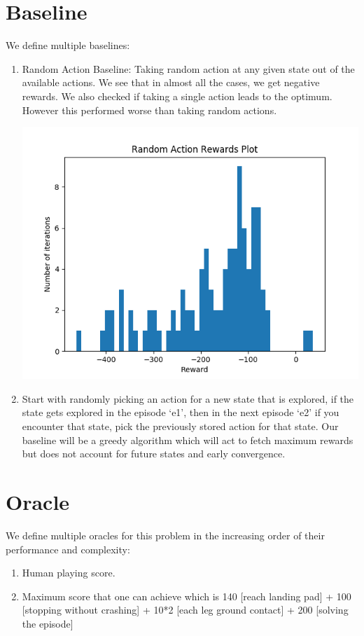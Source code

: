 \documentclass[12pt]{article}
\begin{document}
\section{Baseline}
We define multiple baselines:
\begin{enumerate}[label=(\alph*)]
\item 
\noindent\begin{minipage}{0.6\textwidth}
Random Action Baseline: Taking random action at any given state out of the available actions. We see that in almost all the cases, we get negative rewards. We also checked if taking a single action leads to the optimum. However this performed worse than taking random actions.
\end{minipage}
\begin{minipage}{0.3\textwidth}\raggedleft
\includegraphics[scale=0.3]{images/random-action-reward-plot.png}
\end{minipage}
\item Start with randomly picking an action for a new state that is explored, if the state gets explored in the episode ‘e1’, then in the next episode ‘e2’ if you encounter that state, pick the previously stored action for that state. Our baseline will be a greedy algorithm which will act to  fetch maximum rewards but does not account for future states and early convergence.
\end{enumerate}


\section{Oracle}
We define multiple oracles for this problem in the increasing order of their performance and complexity:
\begin{enumerate}[label=(\alph*)]
\item Human playing score.
\item Maximum score that one can achieve which is 140 [reach landing pad]  + 100 [stopping without crashing] + 10*2 [each leg ground contact] + 200 [solving the episode]
\end{enumerate}
\end{document}
